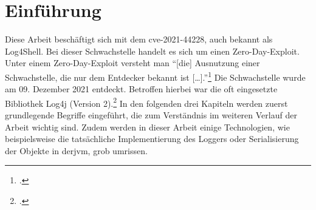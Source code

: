 
\section{Einführung}\label{sec:einfuhrung}
Diese Arbeit beschäftigt sich mit dem \gls{cve}-2021-44228, auch bekannt als Log4Shell.
Bei dieser Schwachstelle handelt es sich um einen Zero-Day-Exploit.
Unter einem Zero-Day-Exploit versteht man ``[die] Ausnutzung einer Schwachstelle, die nur dem Entdecker bekannt ist [\ldots].''\footcite{bsizeroday}
Die Schwachstelle wurde am 09. Dezember 2021 entdeckt.
Betroffen hierbei war die oft eingesetzte Bibliothek Log4j (Version 2).\footcite{lunasec}
In den folgenden drei Kapiteln werden zuerst grundlegende Begriffe eingeführt, die zum Verständnis im weiteren Verlauf der Arbeit wichtig sind.
Zudem werden in dieser Arbeit einige Technologien, wie beispielsweise die tatsächliche Implementierung des Loggers oder Serialisierung der Objekte in der\gls{jvm}, grob umrissen.




